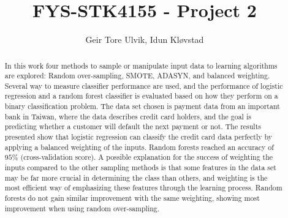 \documentclass[12pt, notitlepage]{article}
\begin{document}
\title{FYS-STK4155 - Project 2}
\author{Geir Tore Ulvik, Idun Kløvstad}
\begin{titlingpage}
\maketitle
\begin{abstract}
In this work four methods to sample or manipulate input data to learning
algorithms are explored: Random over-sampling, SMOTE, ADASYN, and balanced
weighting.
Several way to measure classifier performance are used, and the performance 
of logistic regression and a random forest classifier is evaluated based 
on how they perform on a binary classification problem. 
The data set chosen is payment data from an important bank in Taiwan,
where the data describes credit card holders, and the goal is predicting
whether a customer will default the next payment or not. 
The results presented show that logistic regression can classify the credit 
card data perfectly by applying a balanced weighting of the inputs. 
Random forests reached an accuracy of ~$95\%$ (cross-validation score). 
A possible explanation for the success of weighting the inputs compared 
to the other sampling methods is that some features in the data set may be 
far more crucial in determining the class than others, 
and weighting is the most efficient way of emphasizing these features through 
the learning process. Random forests do not gain similar improvement with
the same weighting, showing most improvement when using random over-sampling.
\end{abstract}
\end{titlingpage}


%



\appendix


\end{document}
